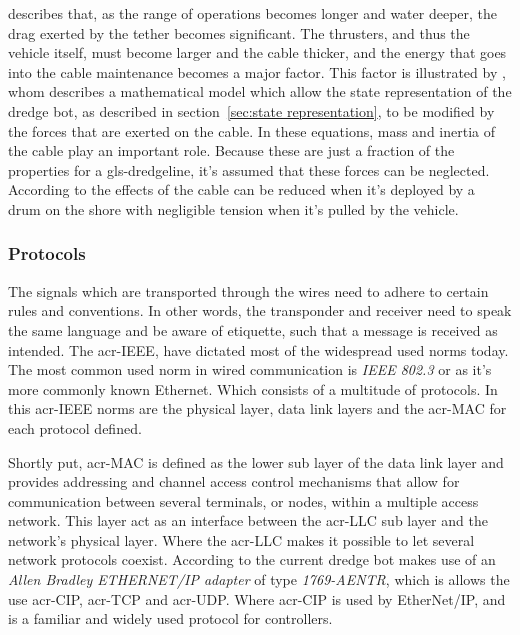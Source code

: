 \citet{westneat_advances_1983} describes that, as the range of operations becomes longer and water deeper, the drag 
exerted by the tether becomes significant. The thrusters, and thus the vehicle itself, must become larger and the 
cable thicker, and the energy that goes into the cable maintenance becomes a major factor. This factor is illustrated
by \citet{fang_motions_2007}, whom describes a mathematical model which allow the state representation of the dredge 
bot, as described in section~\ref{sec:state representation}, to be modified by the forces that are exerted on the cable.
In these equations, mass and inertia of the cable play an important role. Because these are just a fraction of the 
properties for a \gls{gls-dredgeline}, it's assumed that these forces can be neglected. According to 
\citet{feng_evaluation_2004} the effects of the cable can be reduced when it's deployed by a drum on the shore with 
negligible tension when it's pulled by the vehicle.

\subsubsection*{Protocols}\label{sec:wired_protocols}
The signals which are transported through the wires need to adhere to certain rules and conventions. In other words, 
the transponder and receiver need to speak the same language and be aware of etiquette, such that a message is 
received as intended. The \gls{acr-IEEE}, have dictated most of the widespread used norms today. The most common used
norm in wired communication is \textit{IEEE 802.3} or as it's more commonly known Ethernet. Which consists of a 
multitude of protocols. In this \gls{acr-IEEE} norms are the physical layer, data link layers and the \gls{acr-MAC} 
for each protocol defined.

Shortly put, \gls{acr-MAC} is defined as the lower sub layer of the data link layer and provides addressing and 
channel access control mechanisms that allow for communication between several terminals, or nodes, within a multiple
access network. This layer act as an interface between the \gls{acr-LLC} sub layer and the network's physical layer. 
Where the \gls{acr-LLC} makes it possible to let several network protocols coexist.
According to \citet{jolectra_plc_2016} the current dredge bot makes use of an \textit{Allen Bradley ETHERNET/IP 
adapter} of type \textit{1769-AENTR}, which is allows the use \gls{acr-CIP}, \gls{acr-TCP} and \gls{acr-UDP}. Where 
\gls{acr-CIP} is used by EtherNet/IP, and is a familiar and widely used protocol for controllers.

